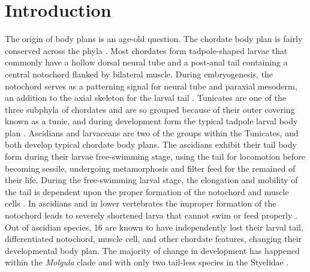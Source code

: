 \chapter{Introduction}
The origin of body plans is an age-old question. The chordate body plan is fairly conserved across the phyla \cite{nishida_cell_2014}. Most chordates form tadpole-shaped larvae that commonly have a hollow dorsal neural tube and a post-anal tail containing a central notochord flanked by bilateral muscle. During embryogenesis, the notochord serves as a patterning signal for neural tube and paraxial mesoderm, an addition to the axial skeleton for the larval tail \cite{jeffery_evolution_1999,stemple_structure_2005}. Tunicates are one of the three subphyla of chordates and are so grouped because of their outer covering known as a tunic, and during development form the typical tadpole larval body plan \cite{huber_evolution_2000}. Ascidians and larvaceans are two of the groups within the Tunicates, and both develop typical chordate body plans. The ascidians exhibit their tail body form during their larvae free-swimming stage, using the tail for locomotion  before becoming sessile, undergoing metamorphosis and filter feed for the remained of their life. During the free-swimming larval stage, the elongation and mobility of the tail is dependent upon the proper formation of the notochord and muscle cells \cite{satoh_ascidian_2003}. In ascidians and in lower vertebrates the improper formation of the notochord leads to severely shortened larva that cannot swim or feed properly \cite{di_gregorio_tail_2002,jiang_ascidian_2005,stemple_structure_2005}. Out of   ascidian species, 16 are known to have independently lost their larval tail, differentiated notochord, muscle cell, and other chordate features, changing their developmental body plan. The majority of change in development has happened within the \textit{Molgula} clade \cite{berrill_studies_1931,swalla_interspecific_1990} and with only two tail-less species in the Styelidae \cite{huber_evolution_2000}. 

